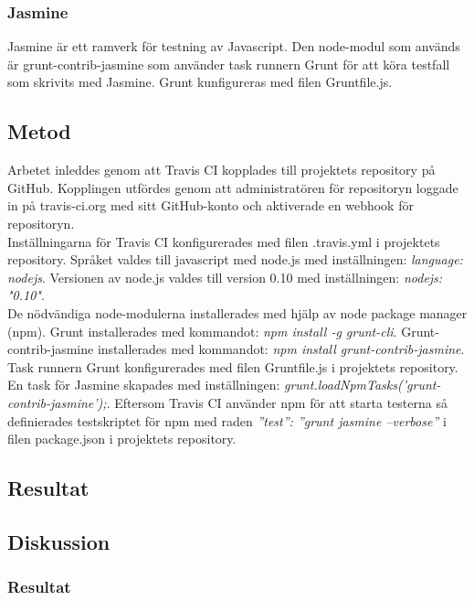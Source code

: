 \subsubsection{Jasmine}
Jasmine är ett ramverk för testning av Javascript. 
Den node-modul som används är grunt-contrib-jasmine som använder task runnern Grunt 
för att köra testfall som skrivits med Jasmine.
Grunt kunfigureras med filen Gruntfile.js.

\subsection{Metod}
Arbetet inleddes genom att Travis CI kopplades till projektets repository på GitHub.
Kopplingen utfördes
genom att administratören för repositoryn loggade in på travis-ci.org med 
sitt GitHub-konto och aktiverade
en webhook för repositoryn.\\

Inställningarna för Travis CI konfigurerades med filen .travis.yml i projektets
repository. Språket valdes till
javascript med node.js med inställningen: \emph{language: node\textunderscore js}.
Versionen av node.js valdes till version 0.10
med inställningen: \emph{node\textunderscore js: "0.10"}.\\

De nödvändiga node-modulerna installerades med hjälp av node package manager (npm).
Grunt installerades
med kommandot: \emph{npm install -g grunt-cli}. Grunt-contrib-jasmine installerades med kommandot: 
\emph{npm install grunt-contrib-jasmine}.\\

Task runnern Grunt konfigurerades med filen Gruntfile.js i projektets repository.
En task för Jasmine skapades med
inställningen: \emph{grunt.loadNpmTasks('grunt-contrib-jasmine');}.
Eftersom Travis CI använder npm för att starta 
testerna så definierades testskriptet för npm med raden
\emph{''test'': ''grunt jasmine --verbose''} i filen package.json 
i projektets repository.

\subsection{Resultat}
\subsection{Diskussion}
\subsubsection{Resultat}
